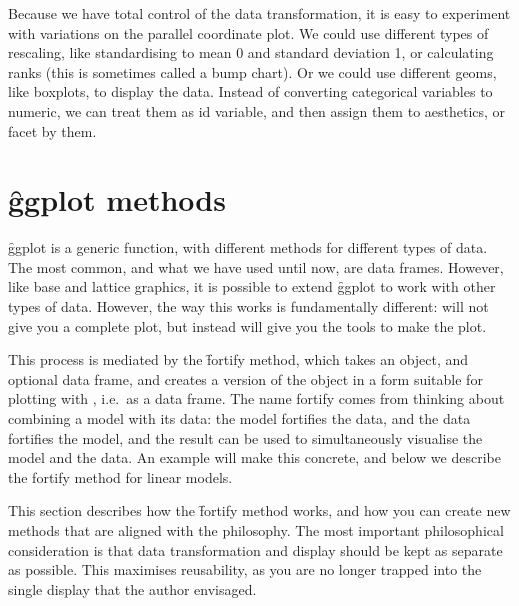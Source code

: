 % 


Because we have total control of the data transformation, it is easy to experiment with variations on the parallel coordinate plot.  We could use different types of rescaling, like standardising to mean 0 and standard deviation 1, or calculating ranks (this is sometimes called a bump chart).  Or we could use different geoms, like boxplots, to display the data.  Instead of converting categorical variables to numeric, we can treat them as id variable, and then assign them to aesthetics, or facet by them.

% 
% 


\section{\f{ggplot} methods}
\label{sec:methods}

\f{ggplot} is a generic function, with different methods for different types of data.  The most common, and what we have used until now, are data frames. However, like base and lattice graphics, it is possible to extend \f{ggplot} to work with other types of data.  However, the way this works is fundamentally different: \ggplot will not give you a complete plot, but instead will give you the tools to make the plot.

This process is mediated by the \f{fortify} method, which takes an object, and optional data frame, and creates a version of the object in a form suitable for plotting with \ggplot, i.e.\ as a data frame.  The name fortify comes from thinking about combining a model with its data: the model fortifies the data, and the data fortifies the model, and the result can be used to  simultaneously visualise the model and the data.  An example will make this concrete, and below we describe the fortify method for linear models.

This section describes how the \f{fortify} method works, and how you can create new methods that are aligned with the \ggplot philosophy.  The most important philosophical consideration is that data transformation and display should be kept as separate as possible.  This maximises reusability, as you are no longer trapped into the single display that the author envisaged.  

